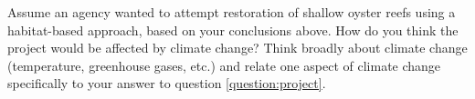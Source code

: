 \documentclass[12pt, addpoints, hidelinks]{exam}
\begin{document}
\begin{questions}

\question[5]
Assume an agency wanted to attempt restoration of shallow oyster reefs using a habitat-based approach, based on your conclusions above. How do you think the project would be affected by climate change? Think broadly about climate change (temperature, greenhouse gases, etc.) and relate one aspect of climate change specifically to your answer to question \ref{question:project}.


\end{questions}
\end{document}
